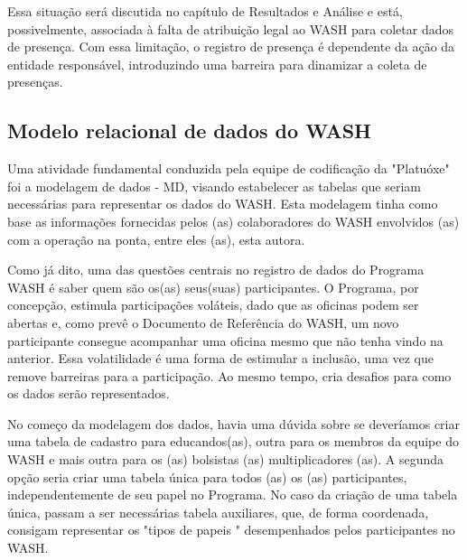 \noindent\begin{flushright}\mbox{\linespread{1}\selectfont\centering{}}\end{flushright}


Essa situação será discutida no capítulo de Resultados e Análise e está, possivelmente, associada à falta de atribuição legal ao WASH para coletar dados de presença. Com essa limitação, o registro de presença é dependente da ação da entidade responsável, introduzindo uma barreira para dinamizar a coleta de presenças.

\subsection[Modelo relacional de dados do WASH]{Modelo relacional de dados do WASH}\label{Modelo relacional de dados do WASH}
Uma atividade fundamental conduzida pela equipe de codificação da "Platuóxe" foi a modelagem de dados - MD, visando estabelecer as tabelas que seriam necessárias para representar os dados do WASH. Esta modelagem tinha como base as informações fornecidas pelos (as) colaboradores do WASH envolvidos (as) com a operação na ponta, entre eles (as), esta autora.

Como já dito, uma das questões centrais no registro de dados do Programa WASH é saber quem são os(as) seus(suas) participantes. O Programa, por concepção, estimula participações voláteis, dado que as oficinas podem ser abertas e, como prevê o Documento de Referência do WASH, um novo participante consegue acompanhar uma oficina mesmo que não tenha vindo na anterior. Essa volatilidade é uma forma de estimular a inclusão, uma vez que remove barreiras para a participação. Ao mesmo tempo, cria desafios para como os dados serão representados.

No começo da modelagem dos dados, havia uma dúvida sobre se deveríamos criar uma tabela de cadastro para educandos(as), outra para os membros da equipe do WASH e mais outra para os (as) bolsistas (as) multiplicadores (as). A segunda opção seria criar uma tabela única para todos (as) os (as) participantes, independentemente de seu papel no Programa. No caso da criação de uma tabela única, passam a ser necessárias tabela auxiliares, que, de forma coordenada, consigam representar os "tipos de papeis "  desempenhados pelos participantes no WASH.

